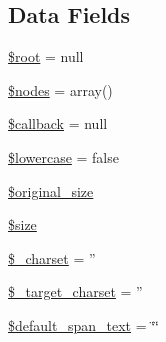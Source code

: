\subsection*{Data Fields}
\begin{DoxyCompactItemize}
\item 
\hyperlink{classsimple__html__dom_ab37f7c32f41c3c61ed940887453767f4}{\$root} = null
\item 
\hyperlink{classsimple__html__dom_afc84f46342a660cca8589570197bc421}{\$nodes} = array()
\item 
\hyperlink{classsimple__html__dom_abc7c2ac0d93d22f71221e8b60512c860}{\$callback} = null
\item 
\hyperlink{classsimple__html__dom_a8e20508789d34bc35e3b00ad58159d1c}{\$lowercase} = false
\item 
\hyperlink{classsimple__html__dom_ac22338e9abaeaf63325d69086f9ac644}{\$original\+\_\+size}
\item 
\hyperlink{classsimple__html__dom_af594986e4618a8d6a5d7566617f583c6}{\$size}
\item 
\hyperlink{classsimple__html__dom_ad6b00a32790b456a2f1668b2010a262e}{\$\+\_\+charset} = ''
\item 
\hyperlink{classsimple__html__dom_a8f23f043ea2af2e56d97bebf17347f23}{\$\+\_\+target\+\_\+charset} = ''
\item 
\hyperlink{classsimple__html__dom_a0da61a0f0e8ff00f0ba83b363d7badda}{\$default\+\_\+span\+\_\+text} = \char`\"{}\char`\"{}
\end{DoxyCompactItemize}
